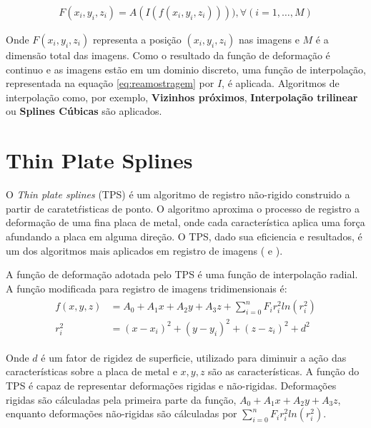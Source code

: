 \begin{align}\label{eq:reamostragem}
    F(x_i, y_i, z_i) = A(I(f(x_i, y_i, z_i)))), \forall (i = 1, \dots, M)
\end{align}

  Onde $F(x_i, y_i, z_i)$ representa a posição $(x_i, y_i, z_i)$ nas imagens e
$M$ é a dimensão total das imagens.
  Como o resultado da função de deformação é continuo e as imagens estão em um
dominio discreto, uma função de interpolação, representada na equação \ref{eq:reamostragem}
por $I$, é aplicada. Algoritmos de interpolação como, por exemplo,
\textbf{Vizinhos próximos}, \textbf{Interpolação trilinear} ou \textbf{Splines Cúbicas}
são aplicados.


\section{Thin Plate Splines}\label{thinPlateSplines}
  O \textit{Thin plate splines} (TPS) \cite{bookstein1989principal} é um
algoritmo de registro não-rigido construido a partir de caratetŕisticas de
ponto. O algoritmo aproxima o processo de registro a deformação de uma fina
placa de metal, onde cada característica aplica uma força afundando a placa em
alguma direção. O TPS, dado sua eficiencia e resultados, é um dos algoritmos
mais aplicados em registro de imagens (\cite{goshtasby2005} e
\cite{rohr1999approximating}).

  A função de deformação adotada pelo TPS é uma função de interpolação radial. A
função modificada para registro de imagens tridimensionais é:
\begin{align}\label{math:tps}
  \begin{split}
    f(x, y, z) &= A_0 + A_1x + A_2y + A_3z + \sum_{i=0}^n F_i r_i^2 ln (r_i^2) \\
    r_i^2 &= (x-x_i)^2 + (y-y_i)^2 + (z-z_i)^2 + d^2
  \end{split}
\end{align}

  Onde $d$ é um fator de rigidez de superficie, utilizado para diminuir a ação
das características sobre a placa de metal e $x, y, z$ são as características. A
função do TPS é capaz de representar deformações rigidas e não-rigidas.
Deformações rigidas são cálculadas pela primeira parte da função,
$A_0 + A_1x + A_2y + A_3z$, enquanto deformações não-rigidas são cálculadas por
$\sum_{i=0}^n F_i r_i^2 ln (r_i^2)$.


